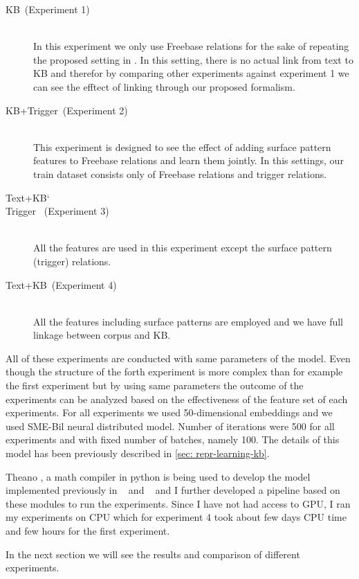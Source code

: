 \begin {description}
\item[KB~(Experiment 1)] \hfil \\
In this experiment we only use Freebase relations for the sake of repeating the
proposed setting in \cite{Bordes2011}. In this setting, there is no actual link
from text to KB and therefor by comparing other experiments against experiment 1
we can see the efftect of linking through our proposed formalism.
\item[KB+Trigger~(Experiment 2)] \hfill \\
This experiment is designed to see the effect of adding surface pattern features
to Freebase relations and learn them jointly. In this settings, our train
dataset consists only of Freebase relations and trigger relations.
\item[Text+KB\char`\\Trigger ~(Experiment 3)] \hfill \\
All the features are used in this experiment except
the surface pattern (trigger) relations. 
\item[Text+KB~(Experiment 4)] \hfill \\
All the features including surface patterns are employed and we have full
linkage between corpus and KB. 
\end{description}

All of these experiments are conducted with same parameters of the model. Even
though the structure of the forth experiment is more complex than for example
the first experiment but by using same parameters the outcome of the experiments
can be analyzed based on the effectiveness of the feature set of each
experiments. For all experiments we used 50-dimensional embeddings and we used
SME-Bil neural distributed model. Number of iterations were 500 for all
experiments and with fixed number of batches, namely 100. The details of this
model has been previously described in \autoref{sec: repr-learning-kb}.

Theano \cite{Bergstra2010}, a math compiler in python is being used to develop
the model implemented previously in ~\cite{Bordes2011} and ~\cite{Bordes2012}
and I further developed a pipeline based on these modules to run the
experiments. Since I have not had access to GPU, I ran my experiments on CPU
which for experiment 4 took about few days CPU time and few hours for the first
experiment.

 In the next section we will see the results and comparison of
different experiments.


